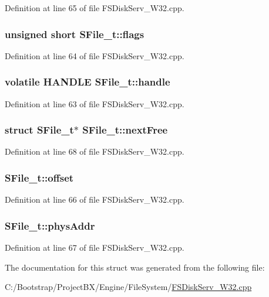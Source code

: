 Definition at line 65 of file FSDiskServ\_\-W32.cpp.\hypertarget{struct_s_file__t_4dafbf10076baf07fe478e79a33fdc8b}{
\subsubsection[{flags}]{\setlength{\rightskip}{0pt plus 5cm}unsigned short {\bf SFile\_\-t::flags}}}
\label{struct_s_file__t_4dafbf10076baf07fe478e79a33fdc8b}




Definition at line 64 of file FSDiskServ\_\-W32.cpp.\hypertarget{struct_s_file__t_9c5b15b8c07aca9928c6a347e765d60f}{
\subsubsection[{handle}]{\setlength{\rightskip}{0pt plus 5cm}volatile HANDLE {\bf SFile\_\-t::handle}}}
\label{struct_s_file__t_9c5b15b8c07aca9928c6a347e765d60f}




Definition at line 63 of file FSDiskServ\_\-W32.cpp.\hypertarget{struct_s_file__t_efe9a20ae13e8a4b3d92770f7f042493}{
\subsubsection[{nextFree}]{\setlength{\rightskip}{0pt plus 5cm}struct {\bf SFile\_\-t}$\ast$ {\bf SFile\_\-t::nextFree}}}
\label{struct_s_file__t_efe9a20ae13e8a4b3d92770f7f042493}




Definition at line 68 of file FSDiskServ\_\-W32.cpp.\hypertarget{struct_s_file__t_3ec63209feb76e69e0d6be30d3cae074}{
\subsubsection[{offset}]{ {\bf SFile\_\-t::offset}}}
\label{struct_s_file__t_3ec63209feb76e69e0d6be30d3cae074}




Definition at line 66 of file FSDiskServ\_\-W32.cpp.\hypertarget{struct_s_file__t_28381f30fa5e5f18fd8c6e6d7f2a76f3}{
\subsubsection[{physAddr}]{ {\bf SFile\_\-t::physAddr}}}
\label{struct_s_file__t_28381f30fa5e5f18fd8c6e6d7f2a76f3}




Definition at line 67 of file FSDiskServ\_\-W32.cpp.

The documentation for this struct was generated from the following file:\begin{CompactItemize}
\item 
C:/Bootstrap/ProjectBX/Engine/FileSystem/\hyperlink{_f_s_disk_serv___w32_8cpp}{FSDiskServ\_\-W32.cpp}\end{CompactItemize}
